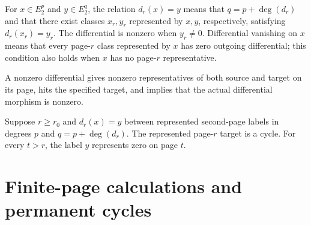\begin{definition}
\label{sem:SpectralSequence:differential}
For $x\in E_2^p$ and $y\in E_2^q$, the relation $d_r(x)=y$ means that $q=p+\deg(d_r)$ and that there exist classes $x_r,y_r$ represented by $x,y$, respectively, satisfying $d_r(x_r)=y_r$. The differential is nonzero when $y_r\neq0$. Differential vanishing on $x$ means that every page-$r$ class represented by $x$ has zero outgoing differential; this condition also holds when $x$ has no page-$r$ representative.

A nonzero differential gives nonzero representatives of both source and target on its page, hits the specified target, and implies that the actual differential morphism is nonzero.

Suppose $r\geq r_0$ and $d_r(x)=y$ between represented second-page labels in degrees $p$ and $q=p+\deg(d_r)$. The represented page-$r$ target is a cycle. For every $t>r$, the label $y$ represents zero on page $t$.
\end{definition}


\section{Finite-page calculations and permanent cycles}


